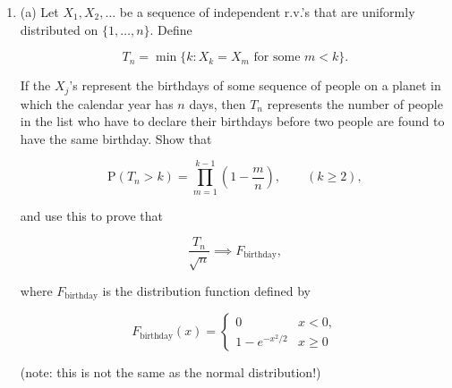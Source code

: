 \documentclass[11pt]{report}
\theoremstyle{plain}
\theoremstyle{definition}
\begin{document}
\begin{enumerate}[label=\arabic*.]
\begin{equation*}
\tag{38}\label{eq:twobounds}
\frac{1}{x+x^{-1}}f(x) \le 1-\Phi(x) \le \frac{1}{x} f(x), \qquad (x>0).
\end{equation*}

Note that for large $x$ this gives a very accurate two-sided bound for the tail of the normal distribution. In fact, it can be shown that

\[
1-\Phi(x) = f(x) \cdot \frac{1}{x+\frac{1}{x+\frac{2}{x+\frac{3}{x+\frac{4}{x+\ldots}}}}}
\]

which gives a relatively efficient method of estimating $\Phi(x)$.

$\textbf{Hint.}$ To prove the upper bound in (\ref{eq:twobounds}), use the fact that for $t>x$ we have $e^{-t^2/2} \le (t/x)e^{-t^2/2}$. For the lower bound, use the identity

\[
\frac{d}{dx}\left(\frac{e^{-x^2/2}}{x}\right) = -\left(1+\frac{1}{x^2}\right) e^{-x^2/2}
\]

to compute $\int_x^\infty (1+u^{-2})e^{-u^2/2}\,du$. On the other hand, show that this integral is bounded from above
by $(1+x^{-2})\int_x^{\infty} e^{-u^2/2}\,du$.
\item (a) Let $X_1, X_2, \ldots$ be a sequence of independent r.v.'s that are uniformly distributed on $\{1,\ldots,n\}$. Define

\[
T_n = \min\{ k : X_k = X_m\textrm{ for some }m<k\}.
\]

If the $X_j$'s represent the birthdays of some sequence of people on a planet in which the calendar year has $n$ days, then $T_n$ represents the number of people in the list who have to declare their birthdays before two people are found to have the same birthday. Show that

\[
\mathrm{P}(T_n > k) = \prod_{m=1}^{k-1} \left(1-\frac{m}{n}\right), \qquad (k\ge 2),
\]

and use this to prove that

\[
\frac{T_n}{\sqrt{n}} \implies F_{\textrm{birthday}},
\]

where $F_{\textrm{birthday}}$ is the distribution function defined by

\[
F_{\textrm{birthday}}(x) = \begin{cases} 0 & x<0, \\ 1- e^{-x^2/2} & x\ge 0 \end{cases}
\]

(note: this is not the same as the normal distribution!)


\end{enumerate}
\end{document}
